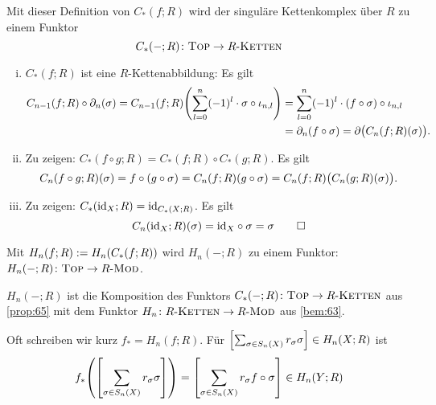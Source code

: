 \begin{proposition}[{name=[{Der singuläre Kettenkomplex über $R$ bildet einen Funktor}]},label=prop:65]
	Mit dieser Definition von $C_*(f;R)$ wird der singuläre Kettenkomplex über $R$ zu einem Funktor
	\[
		C_*(-;R) \colon \textsc{Top} \to R\text{-}\textsc{Ketten}
	\]
\end{proposition}
\begin{beweis}
	\leavevmode
	\begin{enumerate}[(i),itemsep=0pt]
		\item $C_*(f;R)$ ist eine $R$-Kettenabbildung: Es gilt
		\begin{align*}
			C_{n-1}(f;R) \circ \partial_n(\sigma) = C_{n-1} (f;R) \enbrace*{\sum_{l=0}^{n}  (-1)^l \cdot \sigma \circ \iota_{n,l}} &=
			\sum_{l=0}^{n} (-1)^l \cdot (f \circ \sigma) \circ \iota_{n,l} \\
			&= \partial_n(f \circ \sigma) = \partial \enbrace[\big]{C_n(f;R)(\sigma)}.
		\end{align*}
		\item Zu zeigen: $C_*(f \circ g;R) = C_*(f;R) \circ C_*(g;R)$. Es gilt
		\begin{align*}
			C_n(f \circ g;R)(\sigma) = f \circ (g \circ \sigma) = C_n(f;R)(g \circ \sigma) = C_n(f;R) \enbrace[\big]{C_n(g;R)(\sigma)}.
		\end{align*}
		\item Zu zeigen: $C_*(\id_X;R) = \id_{C_*(X;R)}$. Es gilt
		\[
			C_n({\id_X};R)(\sigma) = {\id_{X}} \circ {\sigma} = \sigma \qedhere
		\]
	\end{enumerate}
\end{beweis}

\begin{korollar}[{name=[{Homologie ist ein Funktor $\TOP \to R\text{-}\textsc{Mod}$}]}]
	Mit $H_n(f;R) := H_n \enbrace*{C_*(f;R)}$ wird $H_n(-;R)$ zu einem Funktor: $H_n(-;R) \colon \TOP \to R\text{-}\textsc{Mod}$.
\end{korollar}
\begin{beweis}
	$H_n(-;R)$ ist die Komposition des Funktors $C_*(-;R) \colon \TOP \to R\text{-}\textsc{Ketten}$ aus \autoref{prop:65} mit dem Funktor $H_n \colon R\text{-}\textsc{Ketten} \to R\text{-}\textsc{Mod}$ aus \autoref{bem:63}.
\end{beweis}

\begin{bemerkung}[{name=[Notation für die auf Homologie induzierte Abbildung]}]
	Oft schreiben wir kurz $f_* = H_n(f;R)$.
	Für $\benbrace*{\sum_{\sigma \in S_n(X)} r_\sigma \sigma} \in H_n(X;R)$ ist
	\[
		f_* \enbrace*{\benbrace*{\sum\limits_{\sigma \in S_n(X)} r_\sigma \sigma}} =  \benbrace*{\sum\limits_{\sigma \in S_n(X)} r_\sigma
		f\circ \sigma} \in H_n(Y;R)
	\]
\end{bemerkung}

